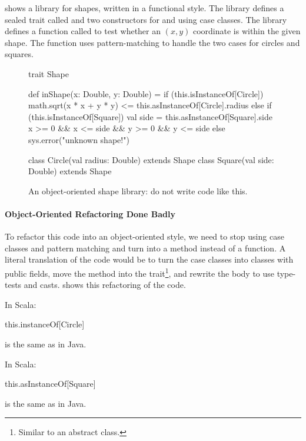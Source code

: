 \documentclass{book}
\begin{document}
 shows a library for shapes, written in a functional style.
The library defines a sealed trait called  and two
constructors for  and  using
case classes. The library defines a function called 
to test whether an $(x,y)$ coordinate is within the given shape. The function
uses pattern-matching to handle the two cases for circles and squares.

\begin{figure}
\begin{scalacode}
trait Shape {

  def inShape(x: Double, y: Double) = {
    if (this.isInstanceOf[Circle]) {
      math.sqrt(x * x + y * y) <= this.asInstanceOf[Circle].radius
    }
    else if (this.isInstanceOf[Square]) {
      val side = this.asInstanceOf[Square].side
      x >= 0 && x <= side && y >= 0 && y <= side
    }
    else {
      sys.error("unknown shape!")
    }
  }

}

class Circle(val radius: Double) extends Shape
class Square(val side: Double) extends Shape
\end{scalacode}
\caption{An object-oriented shape library: do not write code like this.}
\label{jshapesbad}
\end{figure}

\paragraph{Object-Oriented Refactoring Done Badly} To refactor this code into an
object-oriented style, we need to stop using case classes and pattern matching
and turn  into a method instead of a function.
A literal translation of the code would be to turn the case classes
into classes with public fields, move the method into the 
trait\footnote{Similar to an abstract class.}, and rewrite the body to
use type-tests and casts.
  shows this refactoring of the
code.

\begin{notation}
In Scala:
\begin{scalacode}
this.instanceOf[Circle]
\end{scalacode}
is the same as
 in Java.

In Scala:
\begin{scalacode}
this.asInstanceOf[Square]
\end{scalacode}
is the same as  in Java.
\end{notation}
\end{document}
